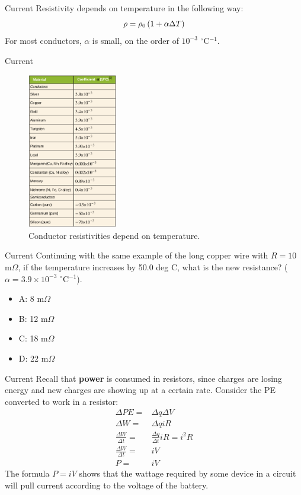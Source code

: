 \documentclass{beamer}
\begin{document}
\begin{frame}{Current}
Resistivity depends on temperature in the following way:
\begin{equation}
\rho = \rho_{\rm 0} \left(1 + \alpha \Delta T\right)
\end{equation}
For most conductors, $\alpha$ is small, on the order of $10^{-3}$ $^\circ$C$^{-1}$.
\end{frame}

\begin{frame}{Current}
\begin{figure}
\centering
\includegraphics[width=0.35\textwidth]{figures/rho3.png}
\caption{\label{fig:rho3} Conductor resistivities depend on temperature.}
\end{figure}
\end{frame}

\begin{frame}{Current}
Continuing with the same example of the long copper wire with $R = 10$ m$\Omega$, if the temperature increases by 50.0 deg C, what is the new resistance? ($\alpha = 3.9 \times 10^{-3}$ $^{\circ}$C$^{-1}$).
\begin{itemize}
\item A: 8 m$\Omega$
\item B: 12 m$\Omega$
\item C: 18 m$\Omega$
\item D: 22 m$\Omega$
\end{itemize}
\end{frame}

\begin{frame}{Current}
Recall that \textbf{power} is consumed in resistors, since charges are losing energy and new charges are showing up at a certain rate.  Consider the PE converted to work in a resistor:
\begin{align}
\Delta PE =& \Delta q\Delta V \\
\Delta W =& \Delta q i R \\
\frac{\Delta W}{\Delta t} =& \frac{\Delta q}{\Delta t} i R = i^2 R \\
\frac{\Delta W}{\Delta t} =& i V \\
P =& iV
\end{align}
The formula $P = iV$ shows that the wattage required by some device in a circuit will pull current according to the voltage of the battery.
\end{frame}
\end{document}
